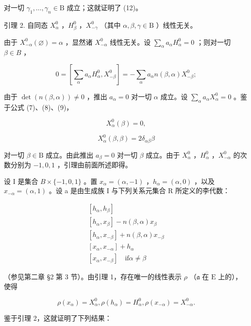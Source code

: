对一切 \(\gamma_1, \ldots, \gamma_n \in \mathrm{B}\) 成立；这就证明了 (12)。

引理 2. 自同态 \(X_{\alpha}^{0}\) ，\(H_{\beta}^{0}\) ，\(X_{-\gamma}^{0}\) （其中 \(\alpha, \beta, \gamma \in \mathrm{B}\) ）线性无关。

由于 \(X_{-\alpha}^{0}(\varnothing) = \alpha\) ，显然诸 \(X_{-\alpha}^{0}\) 线性无关。设 \(\sum_{\alpha} a_{\alpha} H_{\alpha}^{0} = 0\) ；则对一切 \(\beta \in B\) ，

\[
0 = \left[ \sum_ {\alpha} a _ {\alpha} H _ {\alpha} ^ {0}, X _ {- \beta} ^ {0} \right] = - \sum_ {\alpha} a _ {\alpha} n (\beta , \alpha) X _ {- \beta} ^ {0};
\]

由于 \(\operatorname{det}(n(\beta, \alpha)) \neq 0\) ，推出 \(a_{\alpha} = 0\) 对一切 \(\alpha\) 成立。设 \(\sum_{\alpha} a_{\alpha} X_{\alpha}^{0} = 0\) 。鉴于公式 (7)、(8)、(9)，

\[
X _ {\alpha} ^ {0} (\beta) = 0,
\]

\[
X _ {\alpha} ^ {0} (\beta , \beta) = 2 \delta_ {\alpha \beta} \beta
\]

对一切 \(\beta \in \mathrm{B}\) 成立。由此推出 \(a_{\beta} = 0\) 对一切 \(\beta\) 成立。由于 \(X_{\alpha}^{0}\) ，\(H_{\alpha}^{0}\) ，\(X_{-\alpha}^{0}\) 的次数分别为 \(-1, 0, 1\) ，引理由前面所述即得。

设 I 是集合 \(B \times \{-1,0,1\}\) 。置 \(x_{\alpha} = (\alpha, -1)\) ，\(h_{\alpha} = (\alpha, 0)\) ，以及 \(x_{-\alpha} = (\alpha, 1)\) 。设 a 是由生成族 I 与下列关系元集合 R 所定义的李代数：

\[
\begin{array}{l} \left[ h _ {\alpha}, h _ {\beta} \right] \\ \left[ h _ {\alpha}, x _ {\beta} \right] - n (\beta , \alpha) x _ {\beta} \\ \left[ h _ {\alpha}, x _ {- \beta} \right] + n (\beta , \alpha) x _ {- \beta} \\ \left[ x _ {\alpha}, x _ {- \alpha} \right] + h _ {\alpha} \\ \left[ x _ {\alpha}, x _ {- \beta} \right] \quad \text {if} \alpha \neq \beta \end{array}
\]

（参见第二章 §2 第 3 节）。由引理 1，存在唯一的线性表示 \(\rho\) （\(\mathfrak{a}\) 在 \(\mathrm{E}\) 上的），使得

\[
\rho (x _ {\alpha}) = X _ {\alpha} ^ {0}, \rho (h _ {\alpha}) = H _ {\alpha} ^ {0}, \rho (x _ {- \alpha}) = X _ {- \alpha} ^ {0}.
\]

鉴于引理 2，这就证明了下列结果：

